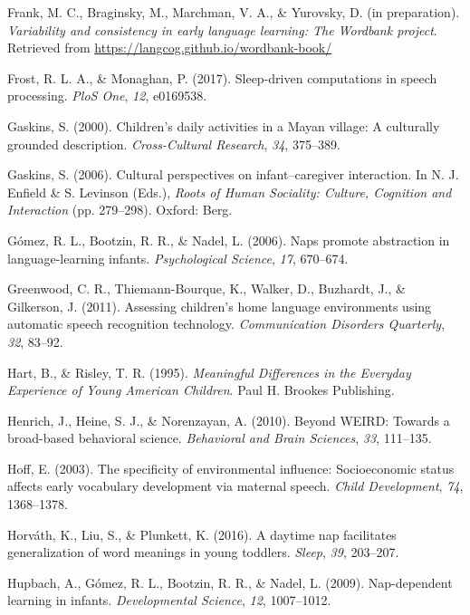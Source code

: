 \documentclass[,man,floatsintext]{apa6}
\begin{document}
\hypertarget{ref-frankIPvariability}{}
Frank, M. C., Braginsky, M., Marchman, V. A., \& Yurovsky, D. (in
preparation). \emph{Variability and consistency in early language
learning: The Wordbank project}. Retrieved from
\url{https://langcog.github.io/wordbank-book/}

\hypertarget{ref-frost2017sleep}{}
Frost, R. L. A., \& Monaghan, P. (2017). Sleep-driven computations in
speech processing. \emph{PloS One}, \emph{12}, e0169538.

\hypertarget{ref-gaskins2000childrens}{}
Gaskins, S. (2000). Children's daily activities in a Mayan village: A
culturally grounded description. \emph{Cross-Cultural Research},
\emph{34}, 375--389.

\hypertarget{ref-gaskins2006cultural}{}
Gaskins, S. (2006). Cultural perspectives on infant--caregiver
interaction. In N. J. Enfield \& S. Levinson (Eds.), \emph{Roots of
Human Sociality: Culture, Cognition and Interaction} (pp. 279--298).
Oxford: Berg.

\hypertarget{ref-gomez2006naps}{}
Gómez, R. L., Bootzin, R. R., \& Nadel, L. (2006). Naps promote
abstraction in language-learning infants. \emph{Psychological Science},
\emph{17}, 670--674.

\hypertarget{ref-greenwood2011assessing}{}
Greenwood, C. R., Thiemann-Bourque, K., Walker, D., Buzhardt, J., \&
Gilkerson, J. (2011). Assessing children's home language environments
using automatic speech recognition technology. \emph{Communication
Disorders Quarterly}, \emph{32}, 83--92.

\hypertarget{ref-hart1995meaningful}{}
Hart, B., \& Risley, T. R. (1995). \emph{Meaningful Differences in the
Everyday Experience of Young American Children}. Paul H. Brookes
Publishing.

\hypertarget{ref-henrich2010beyond}{}
Henrich, J., Heine, S. J., \& Norenzayan, A. (2010). Beyond WEIRD:
Towards a broad-based behavioral science. \emph{Behavioral and Brain
Sciences}, \emph{33}, 111--135.

\hypertarget{ref-hoff2003specificity}{}
Hoff, E. (2003). The specificity of environmental influence:
Socioeconomic status affects early vocabulary development via maternal
speech. \emph{Child Development}, \emph{74}, 1368--1378.

\hypertarget{ref-horvath2016daytime}{}
Horváth, K., Liu, S., \& Plunkett, K. (2016). A daytime nap facilitates
generalization of word meanings in young toddlers. \emph{Sleep},
\emph{39}, 203--207.

\hypertarget{ref-hupbach2009nap}{}
Hupbach, A., Gómez, R. L., Bootzin, R. R., \& Nadel, L. (2009).
Nap-dependent learning in infants. \emph{Developmental Science},
\emph{12}, 1007--1012.
\end{document}
